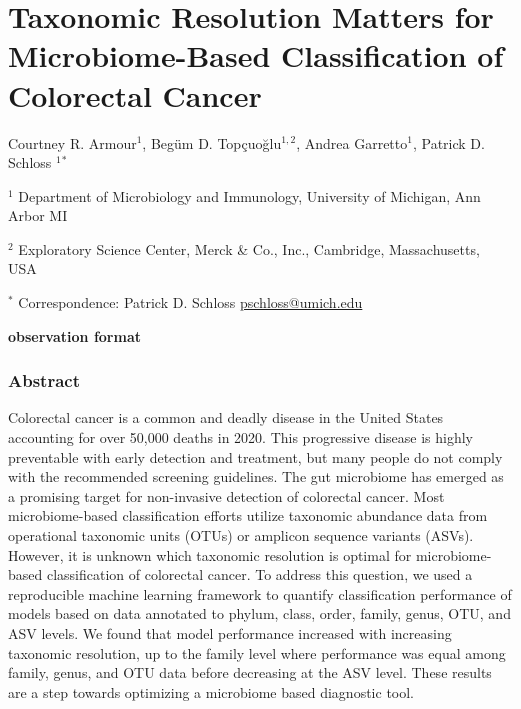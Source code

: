 \documentclass[
]{article}
\author{}
\date{\vspace{-2.5em}}
\begin{document}
\hypertarget{taxonomic-resolution-matters-for-microbiome-based-classification-of-colorectal-cancer}{%
\section{Taxonomic Resolution Matters for Microbiome-Based
Classification of Colorectal
Cancer}\label{taxonomic-resolution-matters-for-microbiome-based-classification-of-colorectal-cancer}}

\vspace{10mm}

Courtney R. Armour\({^1}\), Begüm D. Topçuoğlu\(^{1,2}\), Andrea
Garretto\({^1}\), Patrick D. Schloss \({^1}\)\({^*}\)

\vspace{5mm}

\({^1}\) Department of Microbiology and Immunology, University of
Michigan, Ann Arbor MI

\({^2}\) Exploratory Science Center, Merck \& Co., Inc., Cambridge,
Massachusetts, USA~

\vspace{5mm}

\({^*}\) Correspondence: Patrick D. Schloss
\href{mailto:pschloss@umich.edu}{pschloss@umich.edu}

\vspace{20mm}

\textbf{observation format}

\newpage

\hypertarget{abstract}{%
\subsubsection{Abstract}\label{abstract}}

Colorectal cancer is a common and deadly disease in the United States
accounting for over 50,000 deaths in 2020. This progressive disease is
highly preventable with early detection and treatment, but many people
do not comply with the recommended screening guidelines. The gut
microbiome has emerged as a promising target for non-invasive detection
of colorectal cancer. Most microbiome-based classification efforts
utilize taxonomic abundance data from operational taxonomic units (OTUs)
or amplicon sequence variants (ASVs). However, it is unknown which
taxonomic resolution is optimal for microbiome-based classification of
colorectal cancer. To address this question, we used a reproducible
machine learning framework to quantify classification performance of
models based on data annotated to phylum, class, order, family, genus,
OTU, and ASV levels. We found that model performance increased with
increasing taxonomic resolution, up to the family level where
performance was equal among family, genus, and OTU data before
decreasing at the ASV level. These results are a step towards optimizing
a microbiome based diagnostic tool.
\end{document}
